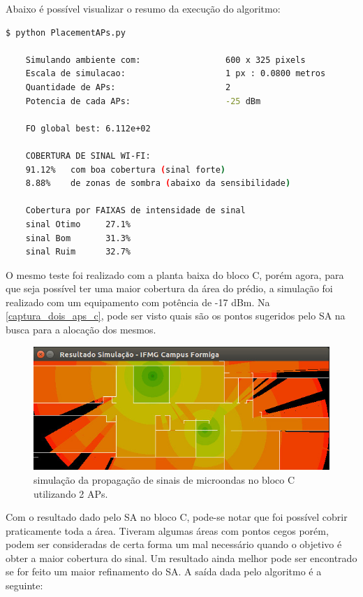 \documentclass[
	12pt,				%
	openright,			%
	twoside,			%
	a4paper,			%
	english,			%
	french,				%
	spanish,			%
	brazil				%
	]{abntex2}
\begin{document}
Abaixo é possível visualizar o resumo da execução do algoritmo:

\begin{lstlisting}[language=bash]
	$ python PlacementAPs.py 
	
	Simulando ambiente com:                 600 x 325 pixels
	Escala de simulacao:                    1 px : 0.0800 metros
	Quantidade de APs:                      2
	Potencia de cada APs:                   -25 dBm
	
	FO global best: 6.112e+02
	
	COBERTURA DE SINAL WI-FI:
	91.12%   com boa cobertura (sinal forte)
	8.88%    de zonas de sombra (abaixo da sensibilidade)
	
	Cobertura por FAIXAS de intensidade de sinal
	sinal Otimo     27.1%
	sinal Bom       31.3%
	sinal Ruim      32.7%

\end{lstlisting}


O mesmo teste foi realizado com a planta baixa do bloco C, porém agora, para que seja possível ter uma maior cobertura da área do prédio, a simulação foi realizado com um equipamento com potência de -17 dBm. Na \autoref{captura_dois_aps_c}, pode ser visto quais são os pontos sugeridos pelo SA na busca para a alocação dos mesmos.

\begin{figure}[ht]
	\caption{\label{captura_dois_aps_c}simulação da propagação de sinais de microondas no bloco C utilizando 2 APs.
	}
	\begin{center}
		\includegraphics[scale=0.7]{images/captura-2-aps-bloco-c-2.jpg}
	\end{center}
\end{figure}

Com o resultado dado pelo SA no bloco C, pode-se notar que foi possível cobrir praticamente toda a área. Tiveram algumas áreas com pontos cegos porém, podem ser consideradas de certa forma um mal necessário quando o objetivo é obter a maior cobertura do sinal. Um resultado ainda melhor pode ser encontrado se for feito um maior refinamento do SA. A saída dada pelo algoritmo é a seguinte:
\end{document}
